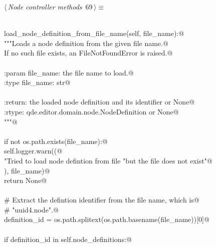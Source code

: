 \documentclass[
    a4paper,      %
    10pt,         %
    openright,    %
    notitlepage,  %
    parskip=half, %
]{scrreprt}       %
\theoremstyle{definition}                    %
\begin{document}
\begin{flushleft} \small
\begin{minipage}{\linewidth}\label{scrap115}\raggedright\small
{} $\langle\,${\itshape Node controller methods}\nobreak\ {\footnotesize {69}}$\,\rangle\equiv$
\vspace{-1exm}
\begin{list}{}{} \item
\mbox{}\lstinline@@\\
\mbox{}\lstinline@def load_node_definition_from_file_name(self, file_name):@\\
\mbox{}\lstinline@    """Loads a node definition from the given file name.@\\
\mbox{}\lstinline@    If no such file exists, an FileNotFoundError is raised.@\\
\mbox{}\lstinline@@\\
\mbox{}\lstinline@    :param file_name: the file name to load.@\\
\mbox{}\lstinline@    :type  file_name: str@\\
\mbox{}\lstinline@@\\
\mbox{}\lstinline@    :return: the loaded node definition and its identifier or None@\\
\mbox{}\lstinline@    :rtype:  qde.editor.domain.node.NodeDefinition or None@\\
\mbox{}\lstinline@    """@\\
\mbox{}\lstinline@@\\
\mbox{}\lstinline@    if not os.path.exists(file_name):@\\
\mbox{}\lstinline@        self.logger.warn((@\\
\mbox{}\lstinline@            "Tried to load node defintion from file %s, "@\\
\mbox{}\lstinline@            "but the file does not exist"@\\
\mbox{}\lstinline@        ), file_name)@\\
\mbox{}\lstinline@        return None@\\
\mbox{}\lstinline@@\\
\mbox{}\lstinline@    # Extract the defintion identifier from the file name, which is@\\
\mbox{}\lstinline@    # "uuid4.node".@\\
\mbox{}\lstinline@    definition_id = os.path.splitext(os.path.basename(file_name))[0]@\\
\mbox{}\lstinline@@\\
\mbox{}\lstinline@    if definition_id in self.node_definitions:@\\

\end{list}
\end{minipage}
\end{flushleft}
\end{document}
